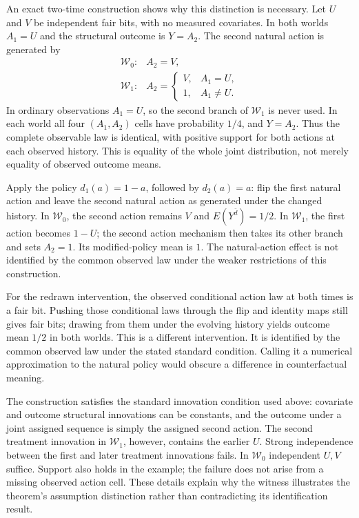 An exact two-time construction shows why this distinction is necessary.
Let $U$ and $V$ be independent fair bits, with no measured covariates. In both
worlds $A_1=U$ and the structural outcome is $Y=A_2$. The second natural action
is generated by
\begin{equation}
 \begin{array}{ll}
 \mathcal W_0:& A_2=V,\\
 \mathcal W_1:&
 A_2=\begin{cases}V,&A_1=U,\\1,&A_1\ne U.\end{cases}
 \end{array}
 \label{exec17:s5-two-worlds}
\end{equation}
In ordinary observations $A_1=U$, so the second branch of $\mathcal W_1$ is
never used. In each world all four $(A_1,A_2)$ cells have probability $1/4$,
and $Y=A_2$. Thus the complete observable law is identical, with positive
support for both actions at each observed history. This is equality of the
whole joint distribution, not merely equality of observed outcome means.

Apply the policy $d_1(a)=1-a$, followed by $d_2(a)=a$: flip the first natural
action and leave the second natural action as generated under the changed
history. In $\mathcal W_0$, the second action remains $V$ and
$E(Y^{\bar d})=1/2$. In $\mathcal W_1$, the first action becomes $1-U$;
the second action mechanism then takes its other branch and sets $A_2=1$.
Its modified-policy mean is $1$. The natural-action effect is not identified
by the common observed law under the weaker restrictions of this construction.

For the redrawn intervention, the observed conditional action law at both
times is a fair bit. Pushing those conditional laws through the flip and
identity maps still gives fair bits; drawing from them under the evolving
history yields outcome mean $1/2$ in both worlds. This is a different
intervention. It is identified by the common observed law under the stated
standard condition. Calling it a numerical approximation to the natural
policy would obscure a difference in counterfactual meaning.

The construction satisfies the standard innovation condition used above:
covariate and outcome structural innovations can be constants, and the
outcome under a joint assigned sequence is simply the assigned second
action. The second treatment innovation in $\mathcal W_1$, however, contains
the earlier $U$. Strong independence between the first and later treatment
innovations fails. In $\mathcal W_0$ independent $U,V$ suffice. Support also
holds in the example; the failure does not arise from a missing observed
action cell. These details explain why the witness illustrates the theorem's
assumption distinction rather than contradicting its identification result.
\citep{lmtp2023,exec17_s5_math}

